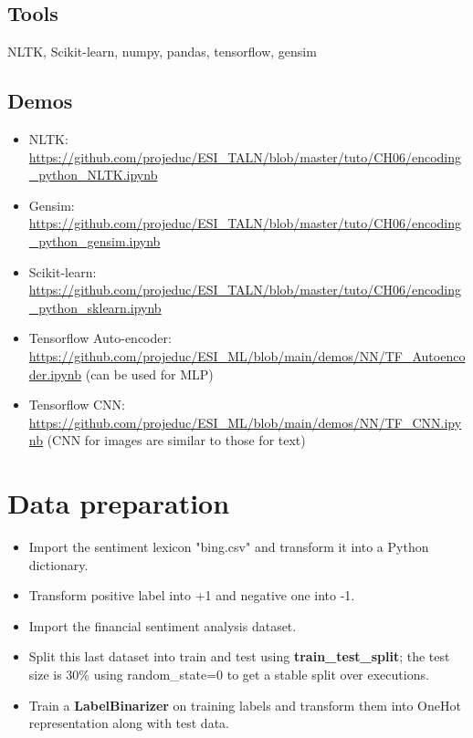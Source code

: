 \documentclass[11pt, a4paper]{article}
\begin{document}
\subsection*{Tools}

NLTK, Scikit-learn, numpy, pandas, tensorflow, gensim


\subsection*{Demos}

\begin{itemize}
	\item NLTK: \url{https://github.com/projeduc/ESI_TALN/blob/master/tuto/CH06/encoding_python_NLTK.ipynb}
	\item Gensim: \url{https://github.com/projeduc/ESI_TALN/blob/master/tuto/CH06/encoding_python_gensim.ipynb}
	\item Scikit-learn: \url{https://github.com/projeduc/ESI_TALN/blob/master/tuto/CH06/encoding_python_sklearn.ipynb}
	\item Tensorflow Auto-encoder: \url{https://github.com/projeduc/ESI_ML/blob/main/demos/NN/TF_Autoencoder.ipynb} (can be used for MLP)
	\item Tensorflow CNN: \url{https://github.com/projeduc/ESI_ML/blob/main/demos/NN/TF_CNN.ipynb} (CNN for images are similar to those for text)
\end{itemize}


\section{Data preparation}

\begin{itemize}
	\item Import the sentiment lexicon "bing.csv" and transform it into a Python dictionary.
	\item Transform positive label into +1 and negative one into -1.
	\item Import the financial sentiment analysis dataset.
	\item Split this last dataset into train and test using \textbf{train\_test\_split}; the test size is 30\% using random\_state=0 to get a stable split over executions.
	\item Train a \textbf{LabelBinarizer} on training labels and transform them into OneHot representation along with test data.
\end{itemize}
\end{document}

